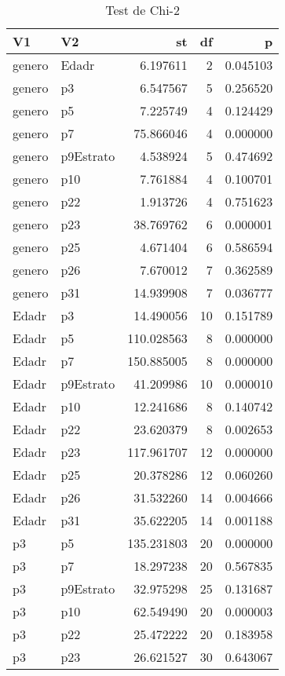 \begin{table}

\caption{Test de Chi-2}
\centering
\begin{tabular}[t]{l|l|r|r|r}
\hline
V1 & V2 & st & df & p\\
\hline
genero & Edadr & 6.197611 & 2 & 0.045103\\
\hline
genero & p3 & 6.547567 & 5 & 0.256520\\
\hline
genero & p5 & 7.225749 & 4 & 0.124429\\
\hline
genero & p7 & 75.866046 & 4 & 0.000000\\
\hline
genero & p9Estrato & 4.538924 & 5 & 0.474692\\
\hline
genero & p10 & 7.761884 & 4 & 0.100701\\
\hline
genero & p22 & 1.913726 & 4 & 0.751623\\
\hline
genero & p23 & 38.769762 & 6 & 0.000001\\
\hline
genero & p25 & 4.671404 & 6 & 0.586594\\
\hline
genero & p26 & 7.670012 & 7 & 0.362589\\
\hline
genero & p31 & 14.939908 & 7 & 0.036777\\
\hline
Edadr & p3 & 14.490056 & 10 & 0.151789\\
\hline
Edadr & p5 & 110.028563 & 8 & 0.000000\\
\hline
Edadr & p7 & 150.885005 & 8 & 0.000000\\
\hline
Edadr & p9Estrato & 41.209986 & 10 & 0.000010\\
\hline
Edadr & p10 & 12.241686 & 8 & 0.140742\\
\hline
Edadr & p22 & 23.620379 & 8 & 0.002653\\
\hline
Edadr & p23 & 117.961707 & 12 & 0.000000\\
\hline
Edadr & p25 & 20.378286 & 12 & 0.060260\\
\hline
Edadr & p26 & 31.532260 & 14 & 0.004666\\
\hline
Edadr & p31 & 35.622205 & 14 & 0.001188\\
\hline
p3 & p5 & 135.231803 & 20 & 0.000000\\
\hline
p3 & p7 & 18.297238 & 20 & 0.567835\\
\hline
p3 & p9Estrato & 32.975298 & 25 & 0.131687\\
\hline
p3 & p10 & 62.549490 & 20 & 0.000003\\
\hline
p3 & p22 & 25.472222 & 20 & 0.183958\\
\hline
p3 & p23 & 26.621527 & 30 & 0.643067\\

\end{tabular}
\end{table}

